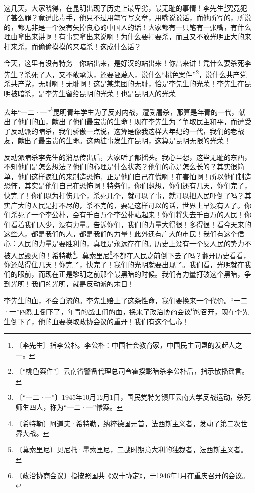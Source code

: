 \documentclass[12pt,UTF-8,openany]{ctexbook}
\begin{document}
\begin{large}
    
    这几天，大家晓得，在昆明出现了历史上最卑劣，最无耻的事情！李先生\footnote{〔李先生〕指李公朴。李公朴：中国社会教育家，中国民主同盟的发起人之一。}究竟犯了甚么罪？竟遭此毒手，他只不过用笔写写文章，用嘴说说话，而他所写的，所说的，都无非是一个没有失掉良心的中国人的话！大家都有一只笔有一张嘴，有什么理由拿出来讲啊！有事实拿出来说啊！为什么要打要杀，而且又不敢光明正大的来打来杀，而偷偷摸摸的来暗杀！这成什么话？
    
    今天，这里有没有特务！你站出来，是好汉的站出来！你出来讲！凭什么要杀死李先生？杀死了人，又不敢承认，还要诬蔑人，说什么“桃色案件”\footnote{〔“桃色案件”〕云南省警备代理总司令霍揆彰暗杀李公朴后，指示散播谣言。}，说什么共产党杀共产党，无耻啊！无耻啊！这是某集团的无耻，恰是李先生的光荣！李先生在昆明被暗杀，是李先生留给昆明的光荣！也是昆明人的光荣！
    
    去年“一二·一”\footnote{〔“一二·一”〕1945年10月12月1日，国民党特务镇压云南大学反战运动，杀死师生四人，称为“一二·一”惨案。}昆明青年学生为了反对内战，遭受屠杀，那算是年青的一代，献出了他们的血，献出了他们最宝贵的生命！现在李先生为了争取民主和平，而遭受了反动派的暗杀，我们骄傲一点说，这算是像我这样大年纪的一代，我们的老战友，献出了最宝贵的生命。这两桩事发生在昆明，这算是昆明无限的光荣！
    
    反动派暗杀李先生的消息传出后，大家听了都摇头。我心里想，这些无耻的东西，不知他们是怎么想法？他们的心理是什么状态？他们的心是怎么长的？其实很简单，他们这样疯狂的来制造恐怖，正是他们自己在慌啊！在害怕啊！所以他们制造恐怖，其实是他们自己在恐怖啊！特务们，你们想想，你们还有几天，你们完了，快完了！你们以为打伤几个，杀死几个，就可以了事，就可以把人民吓倒了吗？其实广大的人民是打不尽的，杀不完的，要是这样可以的话，世界上早没有人了。你们杀死了一个李公朴，会有千百万个李公朴站起来！你们将失去千百万的人民！你们看着我们人少，没有力量。告诉你们，我们的力量大得很！多得很！看今天来的这些人，都是我们的人，都是我们的力量！此外还有广大的市民！我们有这个信心：人民的力量是要胜利的，真理是永远存在的。历史上没有一个反人民的势力不被人民毁灭的！希特勒\footnote{〔希特勒〕阿道夫·希特勒，纳粹德国元首，法西斯主义者，发动了第二次世界大战。}，莫索里尼\footnote{〔莫索里尼〕贝尼托·墨索里尼，二战时期意大利的独裁者，法西斯主义者。}不都在人民之前倒下去了吗？翻开历史看看，你还站得住几天！你完了，快完了！我们的光明就要出现了。我们看，光明就在我们的眼前，而现在正是黎明之前那个最黑暗的时候。我们有力量打破这个黑暗，争到光明！我们的光明，就是反动派的末日！
    
    李先生的血，不会白流的。李先生赔上了这条性命，我们要换来一个代价。“一二·一”四烈士倒下了，年青的战士们的血，换来了政治协商会议\footnote{〔政治协商会议〕指按照国共《双十协定》，于1946年1月在重庆召开的会议。}的召开，现在李先生倒下了，他的血要换取政协会议的重开！我们有这个信心！
    

\end{large}
\end{document}
